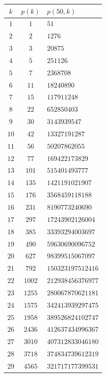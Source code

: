 \documentclass[12pt]{amsart}
\theoremstyle{definition}
\theoremstyle{remark}
\newcommand{\ph}{\phantom{0000}}
\begin{document}
\hspace*{1cm}
\begin{center}
\begin{tabular}{|c|c|l|}
\hline
\phantom{00} $k$ \phantom{00}& \phantom{00} $p(k)$ \phantom{00} & 
\phantom{00} $p(50,k)$ \\
\hline\hline
$1$  & $1$  & \ph $51$       \\ 
$2$  & $2$  & \ph $1276$     \\ 
$3$  & $3$  & \ph $20875$    \\ 
$4$  & $5$  & \ph $251126$   \\ 
$5$  & $7$  & \ph $2368708$  \\ 
$6$  & $11$ & \ph $18240890$ \\
$7$  & $15$ & \ph $117911248$ \\ 
$8$  & $22$ & \ph $652850403$ \\ 
$9$  & $30$ & \ph $3143939547$ \\ 
$10$ & $42$ & \ph $13327191287$ \\ 
$11$ & $56$   & \ph $50207862055$  \\
$12$ & $77$   & \ph $169422173829$  \\
$13$ & $101$   & \ph $515401493777$  \\
$14$ & $135$   & \ph $1421191021907$  \\
$15$ & $176$   & \ph $3568459118188$  \\
$16$ & $231$   & \ph $8190773240690$  \\
$17$ & $297$   & \ph $17243902126004$  \\
$18$ & $385$   & \ph $33393294003697$  \\
$19$ & $490$   & \ph $59630690096752$  \\
$20$ & $627$   & \ph $98399515067097$  \\
$21$ & $792$   & \ph $150323197512416$  \\
$22$ & $1002$   & \ph $212938456376977$  \\
$23$ & $1255$   & \ph $280067870621181$  \\
$24$ & $1575$   & \ph $342413939297475$  \\
$25$ & $1958$   & \ph $389526824102747$  \\
$26$ & $2436$   & \ph $412637434996367$ \ph \\
$27$ & $3010$   & \ph $407312833046180$  \\
$28$ & $3718$   & \ph $374834739612319$  \\
$29$ & $4565$   & \ph $321717177399531$  \\

\end{tabular}
\end{center}
\end{document}
